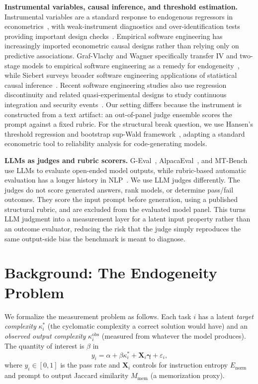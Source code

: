 \documentclass{article}
\begin{document}
\textbf{Instrumental variables, causal inference, and threshold estimation.} Instrumental variables are a standard response to endogenous regressors in econometrics~\cite{wooldridge2010econometric}, with weak-instrument diagnostics and over-identification tests providing important design checks~\cite{stock2005testing,hansen1982large,bowsher2002reject}. Empirical software engineering has increasingly imported econometric causal designs rather than relying only on predictive associations. Graf-Vlachy and Wagner specifically transfer IV and two-stage models to empirical software engineering as a remedy for endogeneity~\cite{grafvlachy2024cleaning}, while Siebert surveys broader software engineering applications of statistical causal inference~\cite{siebert2023applications}. Recent software engineering studies also use regression discontinuity and related quasi-experimental designs to study continuous integration and security events~\cite{guo2019studying,walden2020impact}. Our setting differs because the instrument is constructed from a text artifact: an out-of-panel judge ensemble scores the prompt against a fixed rubric. For the structural break question, we use Hansen's threshold regression and bootstrap sup-Wald framework~\cite{hansen2000sample}, adapting a standard econometric tool to reliability analysis for code-generating models.

\textbf{LLMs as judges and rubric scorers.} G-Eval~\cite{liu2023geval}, AlpacaEval~\cite{alpacaeval}, and MT-Bench~\cite{zheng2023judging} use LLMs to evaluate open-ended model outputs, while rubric-based automatic evaluation has a longer history in NLP~\cite{hashimoto2019unifying}. We use LLM judges differently. The judges do not score generated answers, rank models, or determine pass/fail outcomes. They score the input prompt before generation, using a published structural rubric, and are excluded from the evaluated model panel. This turns LLM judgment into a measurement layer for a latent input property rather than an outcome evaluator, reducing the risk that the judge simply reproduces the same output-side bias the benchmark is meant to diagnose.

\section{Background: The Endogeneity Problem}

We formalize the measurement problem as follows. Each task $i$ has a latent \emph{target complexity} $\kappa_i^*$ (the cyclomatic complexity a correct solution would have) and an \emph{observed output complexity} $\kappa_i^{\text{obs}}$ (measured from whatever the model produces). The quantity of interest is $\beta$ in
\begin{equation}
y_i = \alpha + \beta \kappa_i^* + \mathbf{X}_i \boldsymbol{\gamma} + \varepsilon_i,
\label{eq:structural}
\end{equation}
where $y_i\in[0,1]$ is the pass rate and $\mathbf{X}_i$ controls for instruction entropy $E_{\text{norm}}$ and prompt to output Jaccard similarity $M_{\text{mem}}$ (a memorization proxy).
\end{document}
